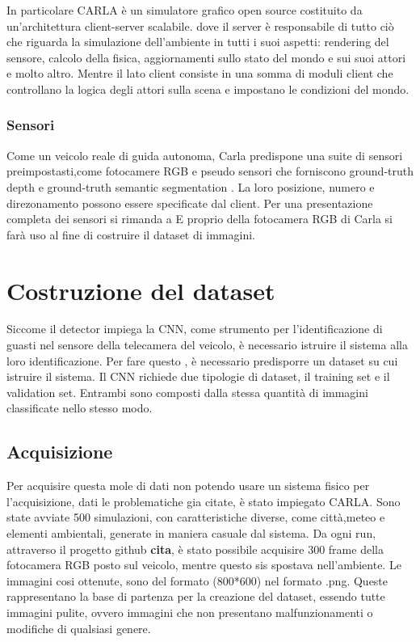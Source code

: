 \documentclass[14pt]{extarticle}
\begin{document}
In particolare CARLA è un simulatore grafico open source costituito da un'architettura client-server scalabile.
dove il server è responsabile  di tutto ciò che riguarda la simulazione dell'ambiente in tutti i suoi aspetti: rendering del sensore, calcolo della fisica, aggiornamenti sullo stato del mondo e sui suoi attori e molto altro. 
Mentre il lato client consiste in una somma di moduli client che controllano la logica degli attori sulla scena e impostano le condizioni del mondo. 
\subsubsection{Sensori}
Come un veicolo reale di guida autonoma, Carla predispone una suite di sensori preimpostasti,come fotocamere RGB e pseudo sensori che forniscono ground-truth depth e ground-truth semantic segmentation .
La loro posizione, numero e direzonamento possono essere specificate dal client.
Per una presentazione completa dei sensori si rimanda a \cite{inserisci qualcosa}
E proprio della fotocamera RGB di Carla si farà uso al fine di costruire il dataset di immagini.
\section{Costruzione del dataset}
Siccome il detector impiega la CNN,  come strumento per l'identificazione di guasti nel sensore della telecamera del veicolo, è necessario istruire il sistema alla loro identificazione. Per fare questo , è necessario predisporre un dataset su cui  istruire il sistema.
Il CNN richiede due tipologie di dataset, il training set e il validation set. Entrambi sono composti dalla stessa quantità di immagini classificate nello stesso modo.

\subsection{Acquisizione}
Per acquisire questa mole di dati non potendo usare un sistema fisico per l'acquisizione, dati le  problematiche gia  citate, è stato impiegato CARLA.
Sono state avviate 500 simulazioni, con caratteristiche diverse, come città,meteo e  elementi ambientali, generate in maniera casuale dal sistema. Da ogni run, attraverso il progetto github \textbf{cita}, è stato possibile acquisire 300 frame della fotocamera RGB posto sul veicolo, mentre questo sis spostava nell'ambiente. 
Le immagini cosi ottenute, sono del formato (800*600) nel formato  .png.
Queste rappresentano la base di partenza per la creazione del dataset, essendo tutte immagini pulite, ovvero immagini che non presentano malfunzionamenti o modifiche di qualsiasi genere.
\end{document}
